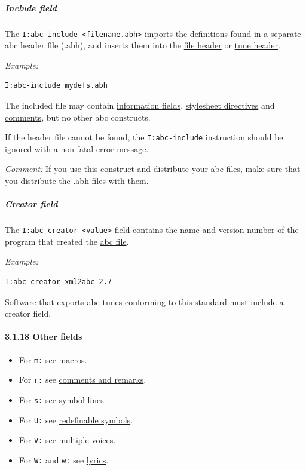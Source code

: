 \documentclass[oneside]{book}
\let\oldparagraph\paragraph
\renewcommand{\paragraph}[1]{\oldparagraph{#1}\mbox{}}
\let\oldsubparagraph\subparagraph
\renewcommand{\subparagraph}[1]{\oldsubparagraph{#1}\mbox{}}
\begin{document}
\hypertarget{include_field}{\subparagraph{Include
field}\label{include_field}}

The \texttt{I:abc-include\ \textless{}filename.abh\textgreater{}}
imports the definitions found in a separate abc header file (.abh), and
inserts them into the \protect\hyperlink{file_header_definition}{file
header} or \protect\hyperlink{tune_header_definition}{tune header}.

\emph{Example:}

\begin{verbatim}
I:abc-include mydefs.abh
\end{verbatim}

The included file may contain
\protect\hyperlink{information_field_definition}{information fields},
\protect\hyperlink{stylesheet_directive_definition}{stylesheet
directives} and \protect\hyperlink{comments_and_remarks}{comments}, but
no other abc constructs.

If the header file cannot be found, the \texttt{I:abc-include}
instruction should be ignored with a non-fatal error message.

\emph{Comment:} If you use this construct and distribute your
\protect\hyperlink{abc_file_definition}{abc files}, make sure that you
distribute the .abh files with them.

\hypertarget{creator_field}{\subparagraph{Creator
field}\label{creator_field}}

The \texttt{I:abc-creator\ \textless{}value\textgreater{}} field
contains the name and version number of the program that created the
\protect\hyperlink{abc_file_definition}{abc file}.

\emph{Example:}

\begin{verbatim}
I:abc-creator xml2abc-2.7
\end{verbatim}

Software that exports \protect\hyperlink{abc_tune_definition}{abc tunes}
conforming to this standard must include a creator field.

\hypertarget{other_fields}{\paragraph{3.1.18 Other
fields}\label{other_fields}}

\begin{itemize}
\item
  For \texttt{m:} see \protect\hyperlink{macros}{macros}.
\item
  For \texttt{r:} see \protect\hyperlink{comments_and_remarks}{comments
  and remarks}.
\item
  For \texttt{s:} see \protect\hyperlink{symbol_lines}{symbol lines}.
\item
  For \texttt{U:} see
  \protect\hyperlink{redefinable_symbols}{redefinable symbols}.
\item
  For \texttt{V:} see \protect\hyperlink{multiple_voices}{multiple
  voices}.
\item
  For \texttt{W:} and \texttt{w:} see
  \protect\hyperlink{lyrics}{lyrics}.
\end{itemize}
\end{document}

